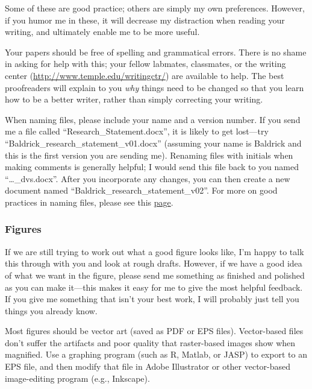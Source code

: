 \documentclass[letterpaper,11pt,oneside]{memoir}
\begin{document}
Some of these are good practice; others are simply my own preferences. However, if you humor me in these, it will decrease my distraction when reading your writing, and ultimately enable me to be more useful.

Your papers should be free of spelling and grammatical errors. There is no shame in asking for help with this; your fellow labmates, classmates, or the writing center (\url{http://www.temple.edu/writingctr/}) are available to help. The best proofreaders will explain to you \textit{why} things need to be changed so that you learn how to be a better writer, rather than simply correcting your writing. 


\begin{shaded}
\noindent When naming files, please include your name and a version number. If you send me a file called ``Research\_Statement.docx'', it is likely to get lost---try ``Baldrick\_research\_statement\_v01.docx'' (assuming your name is Baldrick and this is the first version you are sending me). Renaming files with initials when making comments is generally helpful; I would send this file back to you named ``\ldots\_dvs.docx''. After you incorporate any changes, you can then create a new document named ``Baldrick\_research\_statement\_v02''. For more on good practices in naming files, please see this \href{http://www2.stat.duke.edu/~rcs46/lectures_2015/01-markdown-git/slides/naming-slides/naming-slides.pdf}{page}.
\end{shaded}

\subsubsection{Figures}
If we are still trying to work out what a good figure looks like, I'm happy to talk this through with you and look at rough drafts. However, if we have a good idea of what we want in the figure, please send me something as finished and polished as you can make it---this makes it easy for me to give the most helpful feedback. If you give me something that isn't your best work, I will probably just tell you things you already know.

Most figures should be vector art (saved as PDF or EPS files). Vector-based files don't suffer the artifacts and poor quality that raster-based images show when magnified. Use a graphing program (such as R, Matlab, or JASP) to export to an EPS file, and then modify that file in Adobe Illustrator or other vector-based image-editing program (e.g., Inkscape).
\end{document}
